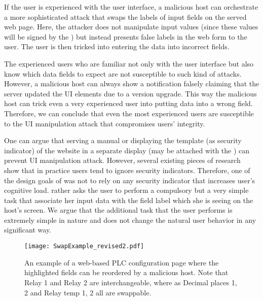 If the user is experienced with the user interface, a malicious host can orchestrate a more sophisticated attack that swaps the labels of input fields on the served web page. Here, the attacker does not manipulate input values (since these values will be signed by the \device) but instead presents false labels in the web form to the user. The user is then tricked into entering the data into incorrect fields.

The experienced users who are familiar not only with the user interface but also know which data fields to expect are not susceptible to such kind of attacks. However, a malicious host can always show a notification falsely claiming that the server updated the UI elements due to a version upgrade. This way the malicious host can trick even a very experienced user into putting data into a wrong field. Therefore, we can conclude that even the most experienced users are susceptible to the UI manipulation attack that compromises users' integrity. 

One can argue that serving a manual or displaying the template (as security indicator) of the website in a separate display (may be attached with the \device) can prevent UI manipulation attack. However, several existing pieces of research~\cite{197283,41927} show that in practice users tend to ignore security indicators. Therefore, one of the design goals of \tool was not to rely on any security indicator that increases user's cognitive load. \tool rather asks the user to perform a compulsory but a very simple task that associate her input data with the field label which she is seeing on the host's screen. We argue that the additional task that the user performs is extremely simple in nature and does not change the natural user behavior in any significant way.

\begin{figure}[t]
  \centering
    \texttt{[image: SwapExample\_revised2.pdf]}
    \caption{An example of a web-based PLC configuration page where the highlighted fields can be reordered by a malicious host. Note that Relay 1 and Relay 2 are interchangeable, where as Decimal places 1, 2 and Relay temp 1, 2 all are swappable.}
    \label{fig:swapExample} 
\end{figure}


